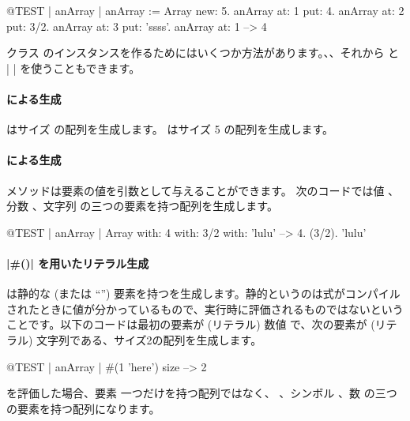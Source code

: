 \documentclass[a4paper,10pt,twoside]{book}
\begin{document}
\begin{code}{@TEST | anArray | }
anArray := Array new: 5.
anArray at: 1 put: 4.
anArray at: 2 put: 3/2.
anArray at: 3 put: 'ssss'.
anArray at: 1 --> 4
\end{code}

クラス  のインスタンスを作るためにはいくつか方法があります。、、それから \ct{#( )} と \ct|{ }| を使うこともできます。

\paragraph{ による生成}  はサイズ  の配列を生成します。
 はサイズ 5 の配列を生成します。

\paragraph{ による生成}  メソッドは要素の値を引数として与えることができます。
次のコードでは値 、分数 、文字列  の三つの要素を持つ配列を生成します。

\begin{code}{@TEST | anArray |}
Array with: 4 with: 3/2 with: 'lulu' -->  {4. (3/2). 'lulu'}
\end{code}

\paragraph{\ct|\#()| を用いたリテラル生成}
\ct{#()} は静的な (または ``'') 要素を持つを生成します。静的というのは式がコンパイルされたときに値が分かっているもので、実行時に評価されるものではないということです。以下のコードは最初の要素が (リテラル) 数値  で、次の要素が (リテラル) 文字列である、サイズ2の配列を生成します。


\begin{code}{@TEST | anArray |}
#(1 'here') size --> 2
\end{code}

 を評価した場合、要素  一つだけを持つ配列ではなく、 \ie {}、シンボル \ct{#+}、数  の三つの要素を持つ配列になります。
\end{document}
